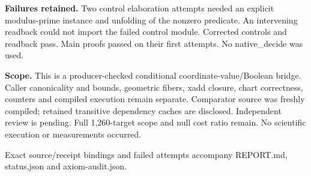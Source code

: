 \documentclass[11pt]{article}\usepackage[margin=0.8in]{geometry}\usepackage[T1]{fontenc}\usepackage{lmodern,tikz,hyperref}\setlength{\parindent}{0pt}\setlength{\parskip}{8pt}\sloppy
\begin{document}
\textbf{Failures retained.} Two control elaboration attempts needed an explicit modulus-prime instance and unfolding of the nonzero predicate. An intervening readback could not import the failed control module. Corrected controls and readback pass. Main proofs passed on their first attempts. No native\_decide was used.

\textbf{Scope.} This is a producer-checked conditional coordinate-value/Boolean bridge. Caller canonicality and bounds, geometric fibers, xadd closure, chart correctness, counters and compiled execution remain separate. Comparator source was freshly compiled; retained transitive dependency caches are disclosed. Independent review is pending. Full 1,260-target scope and null cost ratio remain. No scientific execution or measurements occurred.

Exact source/receipt bindings and failed attempts accompany REPORT.md, status.json and axiom-audit.json.
\end{document}
